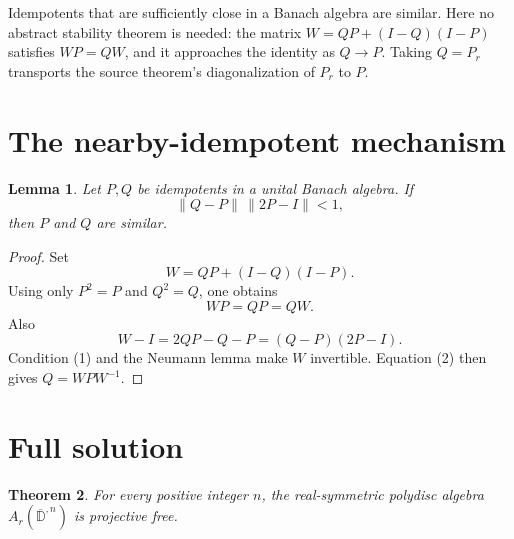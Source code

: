 \documentclass[11pt]{article}
\newtheorem{theorem}{Theorem}
\newtheorem{lemma}[theorem]{Lemma}
\newcommand{\D}{\mathbb D}
\begin{document}
Idempotents that are sufficiently close in a Banach algebra are similar.
Here no abstract stability theorem is needed: the matrix
\(W=QP+(I-Q)(I-P)\) satisfies \(WP=QW\), and it approaches the identity as
\(Q\to P\).  Taking \(Q=P_r\) transports the source theorem's
diagonalization of \(P_r\) to \(P\).

\section{The nearby-idempotent mechanism}

\begin{lemma}
\label{lem:nearby}
Let \(P,Q\) be idempotents in a unital Banach algebra.  If
\[
 \|Q-P\|\,\|2P-I\|<1,                                   \tag{1}
\]
then \(P\) and \(Q\) are similar.
\end{lemma}

\begin{proof}
Set
\[
 W=QP+(I-Q)(I-P).
\]
Using only \(P^2=P\) and \(Q^2=Q\), one obtains
\[
 WP=QP=QW.                                               \tag{2}
\]
Also
\[
 W-I=2QP-Q-P=(Q-P)(2P-I).                               \tag{3}
\]
Condition (1) and the Neumann lemma make \(W\) invertible.  Equation (2)
then gives \(Q=WPW^{-1}\).
\end{proof}

\section{Full solution}

\begin{theorem}
\label{thm:main}
For every positive integer \(n\), the real-symmetric polydisc algebra
\(A_r(\overline{\D}^{,n})\) is projective free.
\end{theorem}
\end{document}
